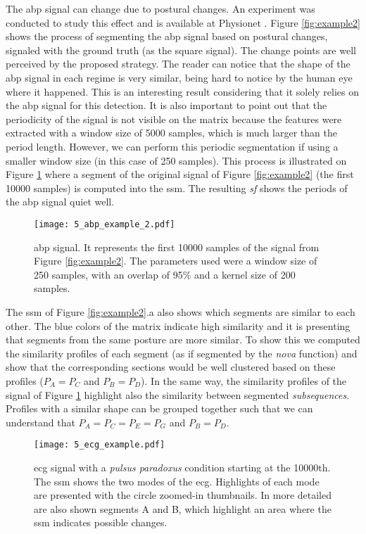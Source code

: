 {The \gls{abp} signal can change due to postural changes. An experiment was conducted to study this effect and is available at Physionet \cite{tilt, PhysioNet}. Figure \ref{fig:example2} shows the process of segmenting the \gls{abp} signal based on postural changes, signaled with the ground truth (as the square signal). The change points are well perceived by the proposed strategy. The reader can notice that the shape of the \gls{abp} signal in each regime is very similar, being hard to notice by the human eye where it happened. This is an interesting result considering that it solely relies on the \gls{abp} signal for this detection. It is also important to point out that the periodicity of the signal is not visible on the matrix because the features were extracted with a window size of 5000 samples, which is much larger than the period length. However, we can perform this periodic segmentation if using a smaller window size (in this case of 250 samples). This process is illustrated on Figure \ref{fig:example2_periodic} where a segment of the original signal of Figure \ref{fig:example2} (the first 10000 samples) is computed into the \gls{ssm}. The resulting \textit{sf} shows the periods of the \gls{abp} signal quiet well.

\begin{figure}
    \centering
    \texttt{[image: 5\_abp\_example\_2.pdf]}
    \caption{\gls{abp} signal. It represents the first 10000 samples of the signal from Figure \ref{fig:example2}. The parameters used were a window size of 250 samples, with an overlap of 95\% and a kernel size of 200 samples.}
    \label{fig:example2_periodic}
\end{figure}

The \gls{ssm} of Figure \ref{fig:example2}.a also shows which segments are similar to each other. The blue colors of the matrix indicate high similarity and it is presenting that segments from the same posture are more similar. To show this we computed the similarity profiles of each segment (as if segmented by the \textit{nova} function) and show that the corresponding sections would be well clustered based on these profiles ($P_A = P_C$ and $P_B=P_D$). In the same way, the similarity profiles of the signal of Figure \ref{fig:example2_periodic} highlight also the similarity between segmented \textit{subsequences}. Profiles with a similar shape can be grouped together such that we can understand that $P_A=P_C=P_E=P_G$ and $P_B=P_D$.

\begin{figure}
    \centering
    \texttt{[image: 5\_ecg\_example.pdf]}
    \caption{\gls{ecg} signal with a \textit{pulsus paradoxus} condition starting at the 10000th. The \gls{ssm} shows the two modes of the \gls{ecg}. Highlights of each mode are presented with the circle zoomed-in thumbnails. In more detailed are also shown segments A and B, which highlight an area where the \gls{ssm} indicates possible changes.}
    \label{fig:example2_3}
\end{figure}

}
